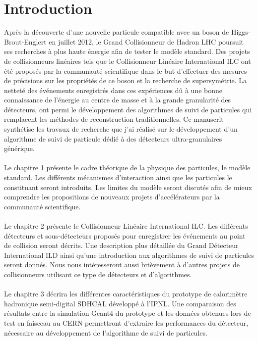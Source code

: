 \chapter*{Introduction}

Après la découverte d'une nouvelle particule compatible avec un boson de Higgs-Brout-Englert en juillet 2012, le Grand Collisionneur de Hadron LHC poursuit ses recherches à plus haute énergie afin de tester le modèle standard. Des projets de collisionneurs linéaires tels que le Collisionneur Linéaire International ILC ont été proposés par la communauté scientifique dans le but d'effectuer des mesures de précisions sur les propriétés de ce boson et la recherche de supersymétrie. La netteté des événements enregistrés dans ces expériences dû à une bonne connaissance de l'énergie au centre de masse et à la grande granularité des détecteurs, ont permi le développement des algorithmes de suivi de particules qui remplacent les méthodes de reconstruction traditionnelles. Ce manuscrit synthétise les travaux de recherche que j'ai réalisé sur le développement d'un algorithme de suivi de particule dédié à des détecteurs ultra-granulaires générique.
\\ \\
Le chapitre 
1
présente le cadre théorique de la physique des particules, le modèle standard. Les différents mécanismes d'interaction ainsi que les particules le constituant seront introduits. Les limites du modèle seront discutés afin de mieux comprendre les propositions de nouveaux projets d'accélérateurs par la communauté scientifique.
\\ \\
Le chapitre 
2
présente le Collisionneur Linéaire International ILC. Les différents détecteurs et sous-détecteurs proposés pour enregistrer les événements au point de collision seront décrits. Une description plus détaillée du Grand Détecteur International ILD ainsi qu'une introduction aux algorithmes de suivi de particules seront donnés. Nous nous intéresseront aussi brièvement à d'autres projets de collisionneurs utilisant ce type de détecteurs et d'algorithmes.
\\ \\
Le chapitre
3
décrira les différentes caractéristiques du prototype de calorimètre hadronique semi-digital SDHCAL développé à l'IPNL. Une comparaison des résultats entre la simulation Geant4 du prototype et les données obtenues lors de test en faisceau au CERN permettront d'extraire les performances du détecteur, nécessaire au développement de l'algorithme de suivi de particules.
